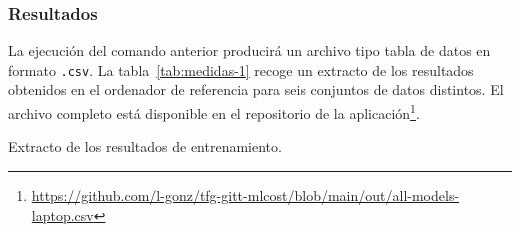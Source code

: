 \subsubsection{Resultados}

La ejecución del comando anterior producirá un archivo tipo tabla de datos en formato \texttt{.csv}. La tabla~\ref{tab:medidas-1} recoge un extracto de los resultados obtenidos en el ordenador de referencia para seis conjuntos de datos distintos. El archivo completo está disponible en el repositorio de la aplicación\footnote{\url{https://github.com/l-gonz/tfg-gitt-mlcost/blob/main/out/all-models-laptop.csv}}.

\begin{table}[H]
\caption[Extracto de los resultados de entrenamiento]{Extracto de los resultados de entrenamiento.}


\end{table}
